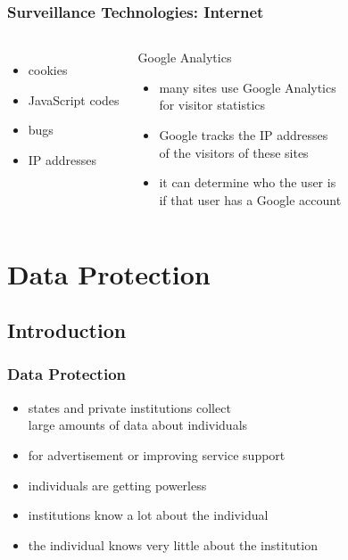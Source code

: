 \documentclass[dvipsnames]{beamer}
\theoremstyle{definition}
\theoremstyle{example}
\theoremstyle{plain}
\begin{document}
\begin{frame}
  \frametitle{Surveillance Technologies: Internet}

  \begin{columns}[t]
    \begin{itemize}
      \item cookies
      \item JavaScript codes
      \item bugs
      \item IP addresses
    \end{itemize}

    \pause
    \begin{exampleblock}{Google Analytics}
      \begin{itemize}
        \item many sites use Google Analytics\\
          for visitor statistics
        \item Google tracks the IP addresses\\
          of the visitors of these sites
        \item it can determine who the user is\\
          if that user has a Google account
      \end{itemize}
    \end{exampleblock}
  \end{columns}
\end{frame}

\section{Data Protection}

\subsection{Introduction}

\begin{frame}
  \frametitle{Data Protection}

  \begin{itemize}
    \item states and private institutions collect\\
      large amounts of data about individuals
    \item for advertisement or improving service support

    \bigskip
    \item individuals are getting powerless
    \item institutions know a lot about the individual
    \item the individual knows very little about the institution
  \end{itemize}
\end{frame}
\end{document}
